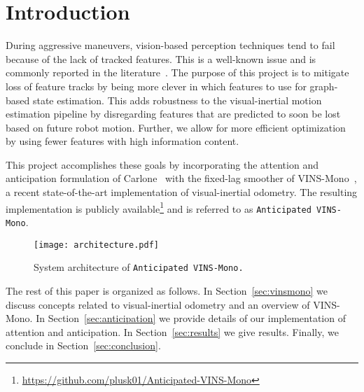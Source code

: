 
\section{Introduction}\label{sec:intro}

During aggressive maneuvers, vision-based perception techniques tend to fail because of the lack of tracked features.
This is a well-known issue and is commonly reported in the literature~\cite{?}.
The purpose of this project is to mitigate loss of feature tracks by being more clever in which features to use for graph-based state estimation.
This adds robustness to the visual-inertial motion estimation pipeline by disregarding features that are predicted to soon be lost based on future robot motion.
Further, we allow for more efficient optimization by using fewer features with high information content.

This project accomplishes these goals by incorporating the attention and anticipation formulation of Carlone~\cite{Carlone2017} with the fixed-lag smoother of VINS-Mono~\cite{Qin2018}, a recent state-of-the-art implementation of visual-inertial odometry.
The resulting implementation is publicly available\footnote{\url{https://github.com/plusk01/Anticipated-VINS-Mono}} and is referred to as \texttt{Anticipated VINS-Mono}.

\begin{figure}
\centering
\texttt{[image: architecture.pdf]} 
\caption{System architecture of \texttt{Anticipated VINS-Mono.}}
\label{fig:architecture} 
\end{figure}

The rest of this paper is organized as follows.
In Section~\ref{sec:vinsmono} we discuss concepts related to visual-inertial odometry and an overview of VINS-Mono.
In Section~\ref{sec:anticipation} we provide details of our implementation of attention and anticipation.
In Section~\ref{sec:results} we give results.
Finally, we conclude in Section~\ref{sec:conclusion}.
